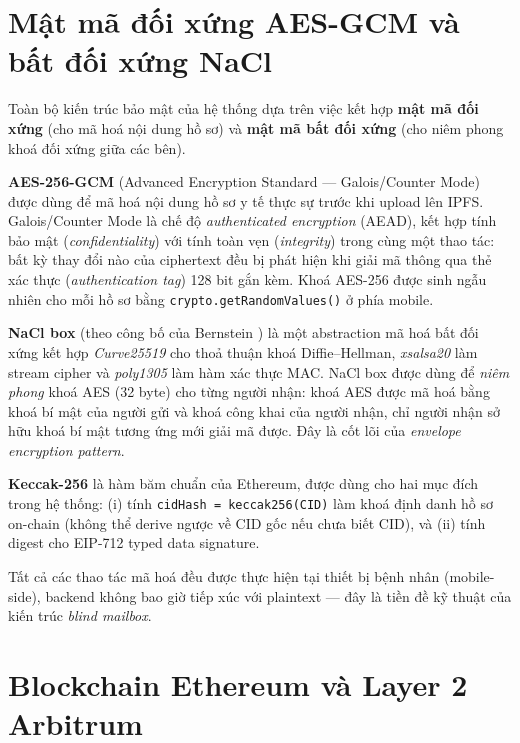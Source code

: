 \documentclass[../DoAn]{subfiles}
\begin{document}

\section{Mật mã đối xứng AES-GCM và bất đối xứng NaCl}

Toàn bộ kiến trúc bảo mật của hệ thống dựa trên việc kết hợp \textbf{mật mã đối xứng} (cho mã hoá nội dung hồ sơ) và \textbf{mật mã bất đối xứng} (cho niêm phong khoá đối xứng giữa các bên).

\textbf{AES-256-GCM} (Advanced Encryption Standard --- Galois/Counter Mode) \cite{nist2007aesgcm} được dùng để mã hoá nội dung hồ sơ y tế thực sự trước khi upload lên IPFS. Galois/Counter Mode là chế độ \textit{authenticated encryption} (AEAD), kết hợp tính bảo mật (\textit{confidentiality}) với tính toàn vẹn (\textit{integrity}) trong cùng một thao tác: bất kỳ thay đổi nào của ciphertext đều bị phát hiện khi giải mã thông qua thẻ xác thực (\textit{authentication tag}) 128 bit gắn kèm. Khoá AES-256 được sinh ngẫu nhiên cho mỗi hồ sơ bằng \texttt{crypto.getRandomValues()} ở phía mobile.

\textbf{NaCl box} (theo công bố của Bernstein \cite{bernstein2009nacl}) là một abstraction mã hoá bất đối xứng kết hợp \textit{Curve25519} cho thoả thuận khoá Diffie--Hellman, \textit{xsalsa20} làm stream cipher và \textit{poly1305} làm hàm xác thực MAC. NaCl box được dùng để \textit{niêm phong} khoá AES (32 byte) cho từng người nhận: khoá AES được mã hoá bằng khoá bí mật của người gửi và khoá công khai của người nhận, chỉ người nhận sở hữu khoá bí mật tương ứng mới giải mã được. Đây là cốt lõi của \textit{envelope encryption pattern}.

\textbf{Keccak-256} là hàm băm chuẩn của Ethereum, được dùng cho hai mục đích trong hệ thống: (i) tính \texttt{cidHash = keccak256(CID)} làm khoá định danh hồ sơ on-chain (không thể derive ngược về CID gốc nếu chưa biết CID), và (ii) tính digest cho EIP-712 typed data signature.

Tất cả các thao tác mã hoá đều được thực hiện tại thiết bị bệnh nhân (mobile-side), backend không bao giờ tiếp xúc với plaintext --- đây là tiền đề kỹ thuật của kiến trúc \textit{blind mailbox}.

\section{Blockchain Ethereum và Layer 2 Arbitrum}
\end{document}
